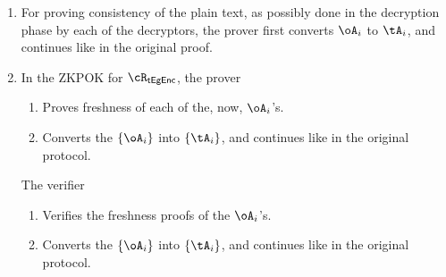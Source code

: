 {\begin{enumerate}
	
	\item For proving consistency of the plain text, as possibly done in the decryption  phase by each of the decryptors, the  prover first converts $\oA_i$   to $\tA_i$, and continues like in the original proof.
	 
	\item In the ZKPOK for  $\rTsEgEnc$, the prover
	\begin{enumerate}
		\item Proves freshness of each of the, now,   $\oA_i$'s.
		
		\item  	Converts the  $\sset{\oA_i}$ into $\sset{\tA_i}$, and continues like in the original protocol.
		
	\end{enumerate}

    The verifier 
    \begin{enumerate}
    	\item Verifies the freshness proofs of the   $\oA_i$'s.
    	
    	\item  	Converts the  $\sset{\oA_i}$ into $\sset{\tA_i}$, and continues like in the original protocol.
    	
    \end{enumerate}
    
	
\end{enumerate} 
}

